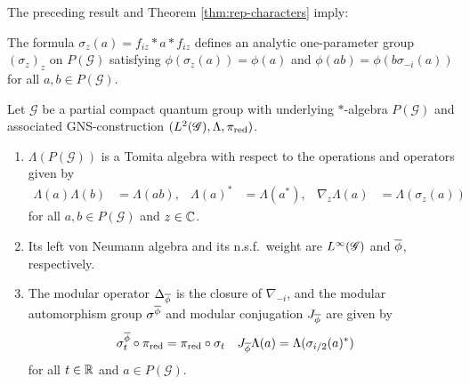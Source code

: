 The preceding result and Theorem \ref{thm:rep-characters}  imply:
\begin{Lem} \label{lem:mod-aut}
  The  formula $\sigma_{z}(a)= f_{iz} \ast a \ast f_{iz}$ defines an analytic one-parameter group $(\sigma_{z})_{z}$ on $P(\mathscr{G})$   satisfying $\phi(\sigma_{z}(a)) = \phi(a)$ and $\phi(ab) = \phi(b\sigma_{-i}(a))$ for all $a,b\in P(\mathscr{G})$.  
\end{Lem}
\begin{Prop} \label{prop:tomita}
  Let $\mathscr{G}$ be a partial compact quantum group with underlying
  $*$-algebra $P(\mathscr{G})$ and associated GNS-construction
  $(L^{2}(\mathscr{G}),\Lambda,\pi_{\operatorname{\mathrm{red}}})$. 
  \begin{enumerate}
  \item  $\Lambda(P(\mathscr{G}))$ is a Tomita algebra with
    respect to the operations and operators given by
    \begin{align*}
      \Lambda(a)\Lambda(b)&=\Lambda(ab), & \Lambda(a)^{*}&=
      \Lambda(a^{*}), & \nabla_{z}\Lambda(a)&=\Lambda(\sigma_{z}(a))
    \end{align*}
    for all $a,b\in P(\mathscr{G})$ and $z\in \mathbb{C}$.
  \item Its
    left von Neumann algebra and its n.s.f.\ weight are $L^{\infty}(\mathscr{G})$ and
    $\overline{\phi}$, respectively.
  \item The modular operator $\Delta_{\overline{\phi}}$ is
    the closure of $\nabla_{-i}$, and the modular automorphism group
    $\sigma^{\overline{\phi}}$ and modular conjugation $J_{\overline{\phi}}$ are given
    by
    \begin{align*}
      \sigma^{\overline{\phi}}_{t} \circ \pi_{\operatorname{\mathrm{red}}} &= \pi_{\operatorname{\mathrm{red}}} \circ
      \sigma_{t}  & J_{\overline{\phi}}
      \Lambda(a)&=\Lambda(\sigma_{i/2}(a)^{*})
    \end{align*}
for all $t\in \mathbb{R}$ and $a\in
      P(\mathscr{G})$.
  \end{enumerate}
\end{Prop}

